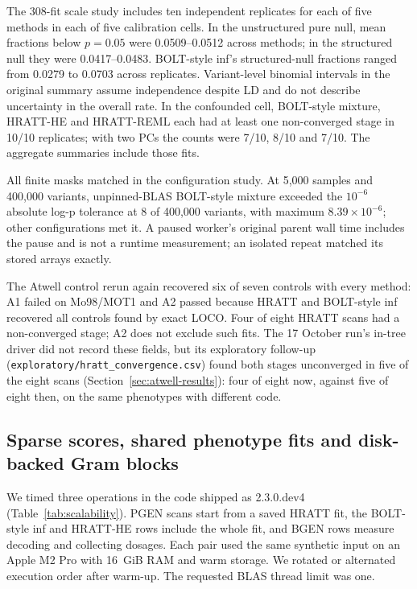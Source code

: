 \documentclass[11pt]{article}
\newcommand{\code}[1]{\texttt{#1}}
\begin{document}
The 308-fit scale study includes ten independent replicates for each of
five methods in each of five calibration cells. In the unstructured pure
null, mean fractions below $p=0.05$ were 0.0509--0.0512 across methods;
in the structured null they were 0.0417--0.0483. BOLT-style inf's structured-null
fractions ranged from 0.0279 to 0.0703 across replicates. Variant-level
binomial intervals in the original summary assume independence despite LD
and do not describe uncertainty in the overall rate.
In the confounded cell, BOLT-style mixture, HRATT-HE and HRATT-REML each had at
least one non-converged stage in 10/10 replicates; with two PCs the counts
were 7/10, 8/10 and 7/10. The aggregate summaries include those fits.

All finite masks matched in the configuration study. At 5,000 samples and
400,000 variants, unpinned-BLAS BOLT-style mixture exceeded the $10^{-6}$
absolute log-p tolerance at 8 of 400,000 variants, with maximum $8.39\times
10^{-6}$; other configurations met it. A paused worker's original parent
wall time includes the pause and is not a runtime measurement; an isolated
repeat matched its stored arrays exactly.

The Atwell control rerun again recovered six of seven controls with every
method: A1 failed on Mo98/MOT1 and A2 passed because HRATT and BOLT-style inf
recovered all controls found by exact LOCO. Four of eight HRATT scans had a
non-converged stage; A2 does not exclude such fits. The 17 October run's
in-tree driver did not record these fields, but its exploratory follow-up
(\code{exploratory/}\allowbreak\code{hratt\_convergence.csv}) found both
stages unconverged in five of the eight scans
(Section~\ref{sec:atwell-results}): four of eight now, against five of eight
then, on the same phenotypes with different code.

\FloatBarrier

\subsection{Sparse scores, shared phenotype fits and disk-backed Gram blocks}
\label{sec:scalability}

We timed three operations in the code shipped as 2.3.0.dev4
(Table~\ref{tab:scalability}). PGEN scans start from a saved HRATT fit, the
BOLT-style inf and HRATT-HE rows include the whole fit, and BGEN rows
measure decoding and collecting dosages. Each pair used the same synthetic
input on an Apple M2 Pro with 16~GiB RAM and warm storage. We rotated
or alternated execution order after warm-up. The requested BLAS thread
limit was one.
\end{document}
